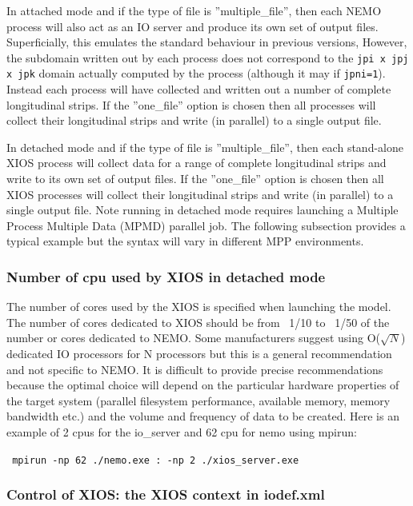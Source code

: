In attached mode and if the type of file is ''multiple\_file'', then each NEMO process will also act as an IO server and produce its own set of output files. Superficially, this emulates the standard behaviour in previous versions, However, the subdomain written out by each process does not correspond to the {\tt jpi x jpj x jpk} domain actually computed by the process (although it may if {\tt jpni=1}). Instead each process will have collected and written out a number of complete longitudinal strips. If the ''one\_file'' option is chosen then all processes will collect their longitudinal strips and write (in parallel) to a single output file. 

In detached mode and if the type of file is ''multiple\_file'', then each stand-alone XIOS process will collect data for a range of complete longitudinal strips and write to its own set of output files. If the ''one\_file'' option is chosen then all XIOS processes will collect their longitudinal strips and write (in parallel) to a single output file. Note running in detached mode requires launching a Multiple Process Multiple Data (MPMD) parallel job. The following subsection provides a typical example but the syntax will vary in different MPP environments.

\subsubsection{Number of cpu used by XIOS in detached mode}

The number of cores used by the XIOS is specified when launching the model. The number of cores dedicated to XIOS should be from ~1/10 to ~1/50 of the number or cores dedicated to NEMO. Some manufacturers suggest using O($\sqrt{N}$) dedicated IO processors for N processors but this is a general recommendation and not specific to NEMO. It is difficult to provide precise recommendations because the optimal choice will depend on the particular hardware properties of the target system (parallel filesystem performance, available memory, memory bandwidth etc.) and the volume and frequency of data to be created. Here is an example of 2 cpus for the io\_server and 62 cpu for nemo using mpirun:

\texttt{ mpirun -np 62 ./nemo.exe : -np 2 ./xios\_server.exe }

\subsubsection{Control of XIOS: the XIOS context in iodef.xml}

